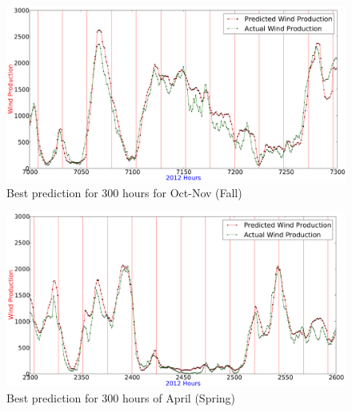 \begin{figure}[H]
\centering
\includegraphics[width=0.99\linewidth]{billeder/bestPossiblePredictionWindProduction7000-7300_Fall.png}
\caption{Best prediction for 300 hours for Oct-Nov (Fall)}
\label{fig:bestPredictWPFallForDiscussion}
\end{figure}

\begin{figure}[H]
\centering
\includegraphics[width=0.99\linewidth]{billeder/bestPossiblePredictionWindProduction2300-2600_April_Spring.png}
\caption{Best prediction for 300 hours of April (Spring)}
\label{fig:bestWPPredictSpringForDiscussion}
\end{figure}

